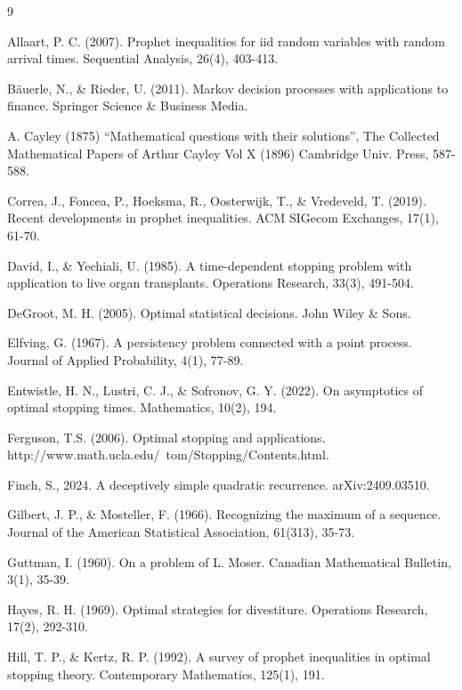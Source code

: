 \documentclass{article}
\numberwithin{equation}{section}
\begin{document}
\begin{thebibliography}{9}
	
	Allaart, P. C. (2007). Prophet inequalities for iid random variables with random arrival times. Sequential Analysis, 26(4), 403-413.
	
	B\"auerle, N., \& Rieder, U. (2011). Markov decision processes with applications to finance. Springer Science \& Business Media.
	
	A. Cayley (1875) “Mathematical questions with their solutions”, The Collected Mathematical Papers of Arthur Cayley Vol X (1896) Cambridge Univ. Press, 587-588.
	
	Correa, J., Foncea, P., Hoeksma, R., Oosterwijk, T., \& Vredeveld, T. (2019). Recent developments in prophet inequalities. ACM SIGecom Exchanges, 17(1), 61-70.
	
	David, I., \& Yechiali, U. (1985). A time-dependent stopping problem with application to live organ transplants. Operations Research, 33(3), 491-504.
	
	DeGroot, M. H. (2005). Optimal statistical decisions. John Wiley \& Sons.
	
	 Elfving, G. (1967). A persistency problem connected with a point process. Journal of Applied Probability, 4(1), 77-89.
	
	Entwistle, H. N., Lustri, C. J., \& Sofronov, G. Y. (2022). On asymptotics of optimal stopping times. Mathematics, 10(2), 194.
	
	Ferguson, T.S. (2006). Optimal stopping and applications. http://www.math.ucla.edu/~tom/Stopping/Contents.html.
	
	 Finch, S., 2024. A deceptively simple quadratic recurrence.  arXiv:2409.03510.
	
	Gilbert, J. P., \& Mosteller, F. (1966). Recognizing the maximum of a sequence. Journal of the American Statistical Association, 61(313), 35-73.
	
	Guttman, I. (1960). On a problem of L. Moser. Canadian Mathematical Bulletin, 3(1), 35-39.
	
	Hayes, R. H. (1969). Optimal strategies for divestiture. Operations Research, 17(2), 292-310.
	
	Hill, T. P., \& Kertz, R. P. (1992). A survey of prophet inequalities in optimal stopping theory. Contemporary Mathematics, 125(1), 191.
	

\end{thebibliography}
\end{document}

